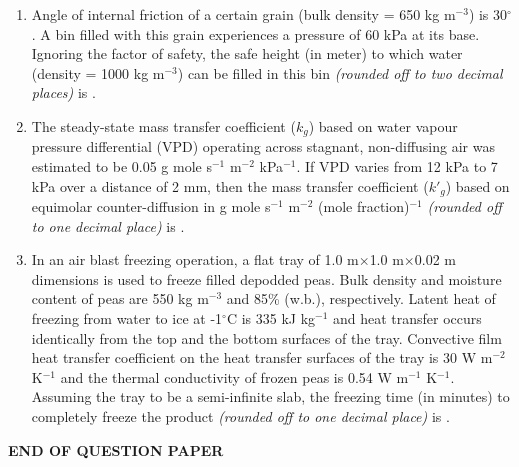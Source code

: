 \documentclass[12pt]{article}
\begin{document}
\begin{enumerate}[label =Q.\arabic*,start=26]
		\item Angle of internal friction of a certain grain (bulk density = 650 kg m$^{-3}$) is 30$^\circ$. A bin filled with this grain experiences a pressure of 60 kPa at its base. Ignoring the factor of safety, the safe height (in meter) to which water (density = 1000 kg m$^{-3}$) can be filled in this bin \textit{(rounded off to two decimal places)} is \underline{\hspace{2cm}}.

		\item The steady-state mass transfer coefficient ($k_g$) based on water vapour pressure differential (VPD) operating across stagnant, non-diffusing air was estimated to be 0.05 g mole s$^{-1}$ m$^{-2}$ kPa$^{-1}$. If VPD varies from 12 kPa to 7 kPa over a distance of 2 mm, then the mass transfer coefficient ($k'_g$) based on equimolar counter-diffusion in g mole s$^{-1}$ m$^{-2}$ (mole fraction)$^{-1}$ \textit{(rounded off to one decimal place)} is \underline{\hspace{2cm}}.

		\item In an air blast freezing operation, a flat tray of 1.0 m$\times$1.0 m$\times$0.02 m dimensions is used to freeze filled depodded peas. Bulk density and moisture content of peas are 550 kg m$^{-3}$ and 85\% (w.b.), respectively. Latent heat of freezing from water to ice at -1$^\circ$C is 335 kJ kg$^{-1}$ and heat transfer occurs identically from the top and the bottom surfaces of the tray. Convective film heat transfer coefficient on the heat transfer surfaces of the tray is 30 W m$^{-2}$ K$^{-1}$ and the thermal conductivity of frozen peas is 0.54 W m$^{-1}$ K$^{-1}$. Assuming the tray to be a semi-infinite slab, the freezing time (in minutes) to completely freeze the product \textit{(rounded off to one decimal place)} is \underline{\hspace{2cm}}.
	\end{enumerate}
	\begin{center}{\textbf{
			END OF QUESTION PAPER}}
	\end{center}
\end{document}
